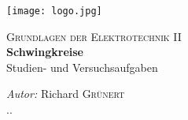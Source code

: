 \documentclass[12pt]{article}
\begin{document}
\begin{titlepage}

\newcommand{\HRule}{\rule{\linewidth}{0.5mm}} %

\center %


\noindent\begin{minipage}[t][0.3819660112501052\paperheight][t]{\textwidth}
\centering
\vspace{0.09016994374947421\paperheight}
\texttt{[image: logo.jpg]}
\end{minipage}

\textsc{\Large Grundlagen der Elektrotechnik II}\\[0.5cm] %


{ \huge \bfseries Schwingkreise}\\ %
\vspace{0.034441853748633004\paperheight}
\large Studien- und Versuchsaufgaben\\
\vspace{0.1458980337503154\paperheight}


\emph{Autor:} Richard {\color{hsblue}\textsc{Grünert}}\\
{\large {\the\day.\the\month.\the\year}}\\




\vfill %

\end{titlepage}
\end{document}
